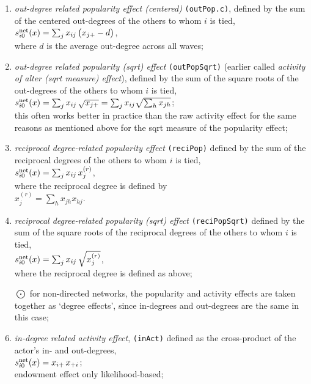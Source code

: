 \documentclass[a4paper,fleqn,11pt]{article}
\newcommand{\+}{\, + \,}
\newcommand{\vit}{\theenumi}
\begin{document}
\begin{enumerate}
 \item {\em out-degree related popularity effect (centered)} \texttt{(outPop.c)},
 defined by the sum of
 the centered out-degrees of the others to whom $i$ is tied,\\
 $s^{\rm net}_{i\vit}(x) =  \sum_j x_{ij}\, \big( x_{j+} - d \big)$,\\
 where $d$ is the average out-degree across all waves;

 \item {\em out-degree related popularity (sqrt) effect} \texttt{(outPopSqrt)}
 (earlier called {\em activity of alter (sqrt measure) effect}), defined by the sum of
 the square roots of the out-degrees of the others to whom $i$ is tied,\\
 $s^{\rm net}_{i\vit}(x) = \sum_j x_{ij}\, \sqrt{x_{j+}} =
  \sum_j x_{ij} \sqrt{\sum_h x_{jh}} $;\\
 this often works better in practice than the raw activity effect
 for the same reasons as mentioned above for the sqrt measure of the popularity effect;

 \item {\em reciprocal degree-related popularity effect} \texttt{(reciPop)}
 defined by the sum of the reciprocal degrees
 of the others to whom $i$ is tied,\\
 $s^{\rm net}_{i\vit}(x) =  \sum_j x_{ij}\, x^{(r)}_{j} $, \\
 where the reciprocal degree is defined by\\
 $ x^{(r)}_{j} = \sum_h x_{jh}x_{hj} $.

 \item {\em reciprocal degree-related popularity (sqrt) effect } \texttt{(reciPopSqrt)}
 defined by the sum of the square roots of the reciprocal degrees
 of the others to whom $i$ is tied,\\
 $s^{\rm net}_{i\vit}(x) =  \sum_j x_{ij}\, \sqrt{x^{(r)}_{j}} $, \\
 where the reciprocal degree is defined as above;

 \item[{\hspace*{-1ex}$\bigodot$}] for non-directed networks, the popularity and activity
 effects are taken together as `degree effects',
 since in-degrees and out-degrees are the same in this case;

 \item {\em in-degree related activity effect}, \texttt{(inAct)}
 defined as  the cross-product  of the actor's in- and out-degrees,\\
 $s^{\rm net}_{i\vit}(x) = x_{i+}\, x_{+i}$;\\
 endowment effect only likelihood-based;


\end{enumerate}
\end{document}
